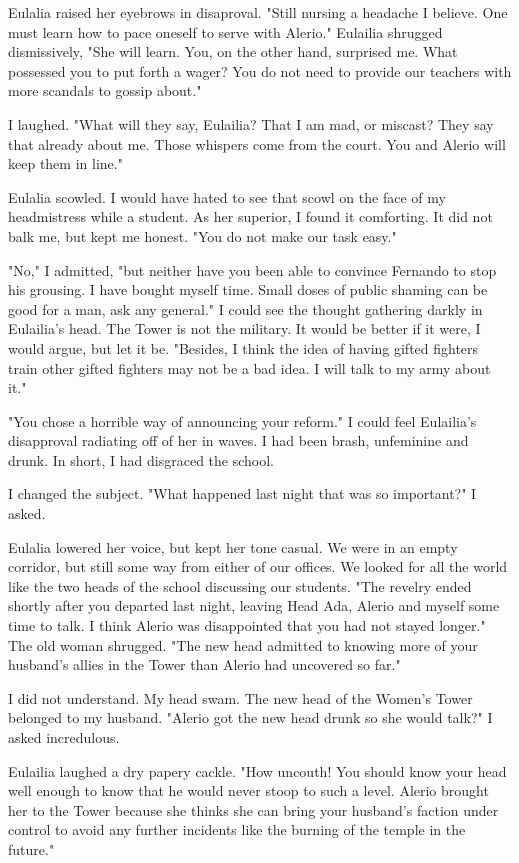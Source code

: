\documentclass{article}
\begin{document}
Eulalia raised her eyebrows in disaproval. "Still nursing a headache I believe. One must learn how to pace oneself to serve with Alerio." Eulailia shrugged dismissively, "She will learn. You, on the other hand, surprised me. What possessed you to put forth a wager? You do not need to provide our teachers with more scandals to gossip about."

I laughed. "What will they say, Eulailia? That I am mad, or miscast? They say that already about me. Those whispers come from the court. You and Alerio will keep them in line."

Eulalia scowled. I would have hated to see that scowl on the face of my headmistress while a student. As her superior, I found it comforting. It did not balk me, but kept me honest. "You do not make our task easy."

"No," I admitted, "but neither have you been able to convince Fernando to stop his grousing. I have bought myself time. Small doses of public shaming can be good for a man, ask any general." I could see the thought gathering darkly in Eulailia's head. The Tower is not the military. It would be better if it were, I would argue, but let it be. "Besides, I think the idea of having gifted fighters train other gifted fighters may not be a bad idea. I will talk to my army about it."

"You chose a horrible way of announcing your reform." I could feel Eulailia's disapproval radiating off of her in waves. I had been brash, unfeminine and drunk. In short, I had disgraced the school. 

I changed the subject. "What happened last night that was so important?" I asked.

Eulalia lowered her voice, but kept her tone casual. We were in an empty corridor, but still some way from either of our offices. We looked for all the world like the two heads of the school discussing our students. "The revelry ended shortly after you departed last night, leaving Head Ada, Alerio and myself some time to talk. I think Alerio was disappointed that you had not stayed longer." The old woman shrugged. "The new head admitted to knowing more of your husband's allies in the Tower than Alerio had uncovered so far."

I did not understand. My head swam. The new head of the Women's Tower belonged to my husband. "Alerio got the new head drunk so she would talk?" I asked incredulous.

Eulailia laughed a dry papery cackle. "How uncouth! You should know your head well enough to know that he would never stoop to such a level. Alerio brought her to the Tower because she thinks she can bring your husband's faction under control to avoid any further incidents like the burning of the temple in the future."
\end{document}
